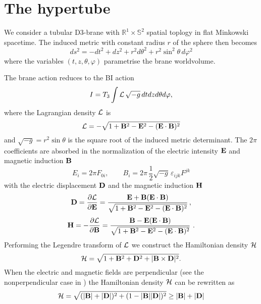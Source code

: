 \documentclass[a4paper,12pt]{article}
\begin{document}
\section{The hypertube}

\noindent  

We consider a tubular D3-brane with $\mathbb{R}^1\times\mathbb{S}^2$ spatial toplogy in flat Minkowski spacetime. The induced metric with constant radius $r$ of the sphere then becomes
\begin{equation}
ds^2=-dt^2+dz^2+r^2d{\theta}^2+r^2{\sin}^2\theta\,d{\varphi}^2
\label{bi1}
\end{equation}
where the variables $(t,z,\theta ,\varphi )$ parametrise the brane worldvolume.


The brane action reduces to the BI action
\begin{equation}
I=T_3\int {\cal L}\,\sqrt{-g}\,dtdzd\theta d\varphi,
\label{bi2}
\end{equation}
where the Lagrangian density ${\cal L}$ is
\begin{equation}
{\cal L}=-\sqrt{1+{{\bf B}}^2-{{\bf E}}^2-({\bf E} \cdot {\bf B})^2}
\label{bi3}
\end{equation}
and $\sqrt{-g}=r^2\sin\theta$ is the square root of the induced metric determinant. The $2\pi$ coefficients are absorbed in the normalization of the electric intensity ${\bf E}$ and magnetic induction ${\bf B}$
\begin{equation}
E_i=2\pi F_{0i},\qquad 
B_i=2\pi\,\frac{1}{2}\sqrt{-g}\,{\varepsilon}_{ijk}F^{jk} 
\label{bi4}
\end{equation}
with the electric displacement ${\bf D}$ and the magnetic induction ${\bf H}$ 
\begin{equation}
{\bf D}=\frac{\partial {\cal L}}{\partial {\bf E}}=\frac{{\bf E}+{\bf B} ({\bf E}\cdot{\bf B})}{\sqrt{1+
{{\bf B}}^2-{{\bf E}}^2-({\bf E}\cdot {\bf B})^2}}\, ,
\label{bi5}
\end{equation}
\begin{equation}
{\bf H} =-\frac{\partial {\cal L}}{\partial {\bf B}}=\frac{{\bf B} -{\bf E} ({\bf E}\cdot{\bf B})}{\sqrt{1+{\bf B}^2-{\bf E}^2-({\bf E}\cdot{\bf B})^2}}\ .
\label{s1}
\end{equation}
Performing the Legendre transform of ${\cal L}$ we construct the Hamiltonian density ${\cal H}$ 
\begin{equation}
{\cal H}=\sqrt{1+{{\bf B}}^2+{{\bf D}}^2+|{\bf B}\times{\bf D}|^2}.
\label{bi6}
\end{equation}
When the electric and magnetic fields are perpendicular (see the nonperpendicular case in \cite{bak2}) the Hamiltonian density ${\cal H}$ can be rewritten as
\begin{equation}
{\cal H}=\sqrt{(|{\bf B} |+|{\bf D} |)^2+(1-|{\bf B} ||{\bf D} |)^2}\ge |{\bf B} |+|{\bf D} |
\label{bi7}
\end{equation}
\end{document}
